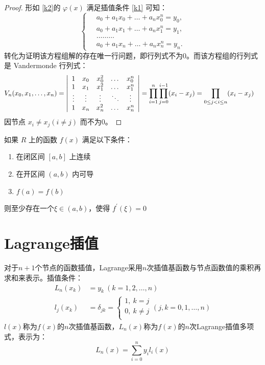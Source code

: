 	\begin{proof}
		形如 \ref{k2}的 $\varphi(x)$ 满足插值条件 \ref{k1} 可知：
		\begin{equation}
			\begin{cases}
			\quad a_0 + a_1 x_0 + \dots + a_n x_0^n = y_0,\\
			\quad a_0 + a_1 x_1 + \dots + a_n x_1^n = y_1,\\
			\quad \dots \dots \dots \\
			\quad a_0 + a_1 x_n + \dots + a_n x_n^n = y_n.
			\end{cases}
		\end{equation}
		转化为证明该方程组解的存在唯一行问题，即行列式不为0。而该方程组的行列式是 Vandermonde 行列式：
		\begin{align}
		V_n(x_0,x_1,\dots,x_n) &= \left| \begin{array}{ccccc}
				1 		& x_{0} 	& x_{0}^{2} & \dots 	& x_{0}^{n} \\
				1		& x_{1} 	& x_{1}^{2} & \dots 	& x_{1}^{n} \\
				\vdots 	& \vdots	& \vdots 	& \ddots 	& \vdots \\
				1 		& x_{n} 	& x_{n}^{2} & \dots 	& x_{n}^{n} \\
			\end{array} \right| \notag = \prod_{i=1}^n \prod_{j=0}^{i-1}(x_i-x_j) 
		= \prod_{0 \le j<i \le n}(x_i-x_j) \notag
		\end{align}
		因节点 $x_i \neq x_j (i \neq j)$ 而不为0。
	\end{proof}

		\begin{theorem}
		如果 $R$ 上的函数 $f(x)$ 满足以下条件：
			\begin{enumerate}
				\item 在闭区间 $[a,b]$ 上连续
				\item 在开区间 $(a,b)$ 内可导
				\item $f(a)=f(b)$
			\end{enumerate}
		则至少存在一个$\xi \in (a,b)$，使得 $f^{\prime}(\xi)=0$
		\end{theorem}


\section{Lagrange插值}
	对于$n+1$个节点的函数插值，Lagrange采用$n$次插值基函数与节点函数值的乘积再求和来表示。插值条件：
	\begin{align}
		L_n(x_k) &= y_k \ (k = 1,2,\dots,n) \\
		l_j(x_k) &= \delta_{jk} = 
		\begin{cases}
		1,\  k=j \\
		0,\ k\neq j\\ \end{cases}
		(j,k = 0,1,\dots,n)
	\end{align}
	$l(x)$称为$f(x)$的$n$次插值基函数，$L_n(x)$称为$f(x)$的$n$次Lagrange插值多项式，表示为：
	\begin{equation}
		L_n(x) = \sum_{i=0}^n y_i l_i(x)
	\end{equation}

